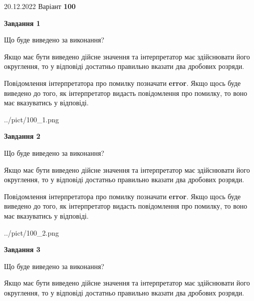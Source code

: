\documentclass[12pt, ukrainian]{article}
\begin{document}
{20.12.2022 Варіант \No \textbf { 100 }\par}
{
\begin {Large}

{\begin {center}\textbf{Завдання 1}\end {center}}\par
Що буде виведено за виконання? \par

Якщо має бути виведено дійсне значення та інтерпретатор має здійснювати його округлення, 
то у відповіді достатньо правильно вказати два дробових розряди.

Повідомлення інтерпретатора про помилку позначати \textbf{error}.
Якщо щось буде виведено до того, як інтерпретатор видасть повідомлення про помилку, 
то воно має вказуватись у відповіді. \par

\begin{center}
	{../pict/100_1.png}
\end{center}
\newpage

{\begin {center}\textbf{Завдання 2}\end {center}}\par
Що буде виведено за виконання? \par

Якщо має бути виведено дійсне значення та інтерпретатор має здійснювати його округлення, 
то у відповіді достатньо правильно вказати два дробових розряди.

Повідомлення інтерпретатора про помилку позначати \textbf{error}.
Якщо щось буде виведено до того, як інтерпретатор видасть повідомлення про помилку, 
то воно має вказуватись у відповіді. \par

\begin{center}
	{../pict/100_2.png}
\end{center}
\newpage

{\begin {center}\textbf{Завдання 3}\end {center}}\par
Що буде виведено за виконання? \par

Якщо має бути виведено дійсне значення та інтерпретатор має здійснювати його округлення, 
то у відповіді достатньо правильно вказати два дробових розряди.


\end{Large}}
\end{document}
